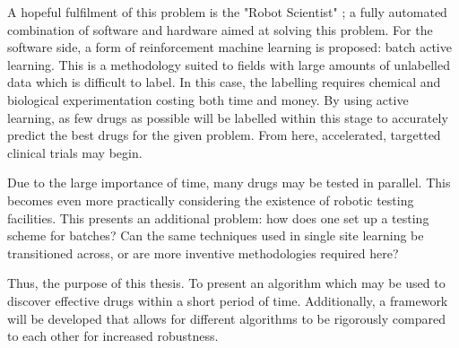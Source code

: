 A hopeful fulfilment of this problem is the "Robot Scientist" \cite{And10}; a fully automated combination of software and hardware aimed at solving this problem. For the software side, a form of reinforcement machine learning is proposed: batch active learning. This is a methodology suited to fields with large amounts of unlabelled data which is difficult to label. In this case, the labelling requires chemical and biological experimentation costing both time and money. By using active learning, as few drugs as possible will be labelled within this stage to accurately predict the best drugs for the given problem. From here, accelerated, targetted clinical trials may begin.

Due to the large importance of time, many drugs may be tested in parallel. This becomes even more practically considering the existence of robotic testing facilities. This presents an additional problem: how does one set up a testing scheme for batches? Can the same techniques used in single site learning be transitioned across, or are more inventive methodologies required here?

Thus, the purpose of this thesis. To present an algorithm which may be used to discover effective drugs within a short period of time. Additionally, a framework will be developed that allows for different algorithms to be rigorously compared to each other for increased robustness.